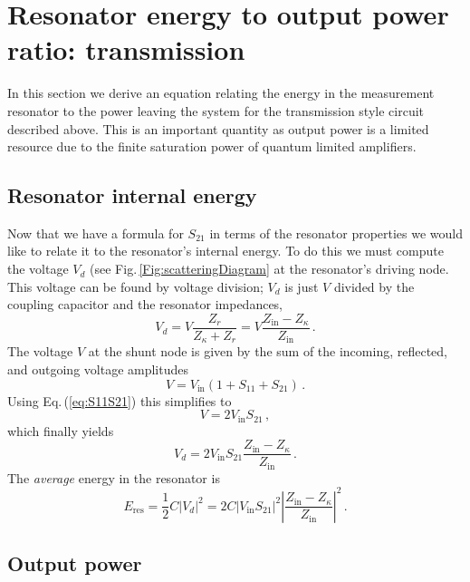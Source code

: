 \section{Resonator energy to output power ratio: transmission}

In this section we derive an equation relating the energy in the measurement resonator to the power leaving the system for the transmission style circuit described above.
This is an important quantity as output power is a limited resource due to the finite saturation power of quantum limited amplifiers.

\subsection{Resonator internal energy}

Now that we have a formula for $S_{21}$ in terms of the resonator properties we would like to relate it to the resonator's internal energy. To do this we must compute the voltage $V_d$ (see Fig.\,\ref{Fig:scatteringDiagram} at the resonator's driving node. This voltage can be found by voltage division; $V_d$ is just $V$ divided by the coupling capacitor and the resonator impedances, \begin{equation}
V_d = V \frac{Z_r}{Z_{\kappa} + Z_r} = V \frac{Z_{\text{in}}-Z_{\kappa}}{Z_{\text{in}}} \, . \end{equation}
The voltage $V$ at the shunt node is given by the sum of the incoming, reflected, and outgoing voltage amplitudes \begin{equation}
V = V_{\text{in}} \left( 1 + S_{11} + S_{21} \right) \, . \label{eq:VinS} \end{equation}
Using Eq.\,(\ref{eq:S11S21})  this simplifies to \begin{equation}
V = 2 V_{\text{in}} S_{21} \, , \end{equation}
which finally yields \begin{equation}
V_d = 2V_{\text{in}}S_{21} \frac{Z_{\text{in}} - Z_{\kappa}}{Z_{\text{in}}} \, . \end{equation}
The \emph{average} energy in the resonator is
\begin{equation}
E_{\text{res}}=\frac{1}{2}C|V_d|^2 = 2C \left| V_{\text{in}} S_{21} \right|^2 \left| \frac{Z_{\text{in}} - Z_{\kappa}}{Z_{\text{in}}} \right|^2 \, .
\end{equation}

\subsection{Output power}

